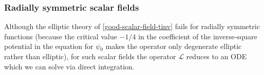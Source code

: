 \documentclass[10pt, reqno]{amsart}
\begin{document}
\subsubsection{Radially symmetric scalar fields}
Although the elliptic theory of \cref{good-scalar-field-tinv} fails for radially
symmetric functions (because the critical value \(-1/4\) in the coefficient of
the inverse-square potential in the equation for \(\psi{}_0\) makes the operator
only degenerate elliptic rather than elliptic), for such scalar fields the
operator \(\mathcal{L}\) reduces to an ODE which we can solve via direct
integration.
\end{document}
